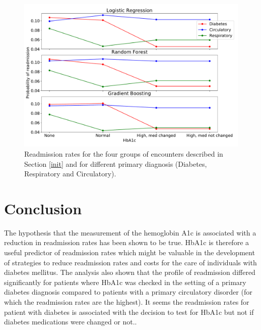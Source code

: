 \documentclass[12pt]{article}
\begin{document}
\begin{figure}[t!]
   \centering
    \includegraphics[width=14cm]{prob_A1c.pdf}
    \caption{\small Readmission rates for the four groups of encounters described in Section \ref{init} and for different primary diagnosis (Diabetes, Respiratory and Circulatory). }
    \label{prob_A1c}
\end{figure}

\section{Conclusion}

The hypothesis that the measurement of the hemoglobin A1c is associated with a reduction in readmission rates has been shown to be true.  HbA1c is therefore a useful predictor of readmission rates which might be valuable in the development of strategies to reduce readmission rates and costs for the care of individuals with diabetes mellitus.
The analysis also shown that the profile of readmission differed  significantly for patients where HbA1c was checked in the setting of a primary diabetes diagnosis compared to patients with a primary circulatory disorder (for which the readmission rates are the highest). It seems the readmission rates for patient with diabetes is associated with the decision to test for HbA1c but not if diabetes medications were changed or not..


\end{document}
